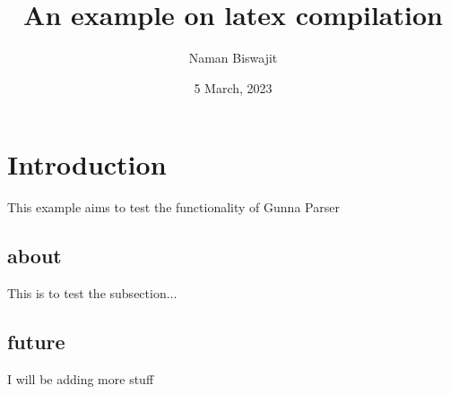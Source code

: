 \documentclass{article}
\title{An example on latex compilation }
\author{Naman Biswajit }
\date{5 March, 2023 }
\begin{document}
\makehead



 
\section{Introduction  }

This example aims to test the functionality of Gunna Parser 
 
\subsection{about  }

This is to test the subsection... 
 
\subsection{future  }

I will be adding more stuff 
\end{document}
